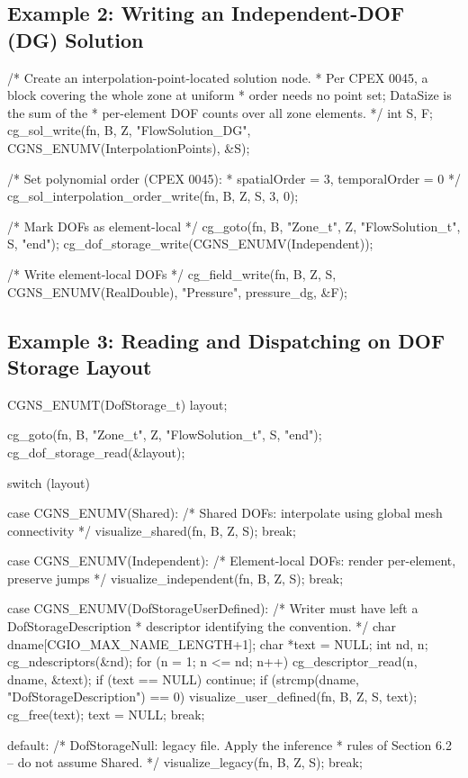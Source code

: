 \documentclass[11pt,letterpaper]{article}
\makeatletter
\let\cgns@orig@lstlisting\lstlisting
\let\cgns@endorig@lstlisting\endlstlisting
\renewenvironment{lstlisting}
  {\par\needspace{5\baselineskip}\nolinenumbers\cgns@orig@lstlisting}
  {\cgns@endorig@lstlisting\par\linenumbers}
\makeatother
\begin{document}
\subsection{Example 2: Writing an Independent-DOF (DG) Solution}
\label{ex:dg-write}

\begin{lstlisting}[language=C]
/* Create an interpolation-point-located solution node.
 * Per CPEX 0045, a block covering the whole zone at uniform
 * order needs no point set; DataSize is the sum of the
 * per-element DOF counts over all zone elements. */
int S, F;
cg_sol_write(fn, B, Z, "FlowSolution_DG",
    CGNS_ENUMV(InterpolationPoints), &S);

/* Set polynomial order (CPEX 0045):
 * spatialOrder = 3, temporalOrder = 0 */
cg_sol_interpolation_order_write(fn, B, Z, S, 3, 0);

/* Mark DOFs as element-local */
cg_goto(fn, B, "Zone_t", Z, "FlowSolution_t", S, "end");
cg_dof_storage_write(CGNS_ENUMV(Independent));

/* Write element-local DOFs */
cg_field_write(fn, B, Z, S, CGNS_ENUMV(RealDouble),
    "Pressure", pressure_dg, &F);
\end{lstlisting}

\subsection{Example 3: Reading and Dispatching on DOF Storage Layout}
\label{ex:dispatch}

\begin{lstlisting}[language=C]
CGNS_ENUMT(DofStorage_t) layout;

cg_goto(fn, B, "Zone_t", Z, "FlowSolution_t", S, "end");
cg_dof_storage_read(&layout);

switch (layout) {
case CGNS_ENUMV(Shared):
    /* Shared DOFs: interpolate using global mesh connectivity */
    visualize_shared(fn, B, Z, S);
    break;

case CGNS_ENUMV(Independent):
    /* Element-local DOFs: render per-element, preserve jumps */
    visualize_independent(fn, B, Z, S);
    break;

case CGNS_ENUMV(DofStorageUserDefined): {
    /* Writer must have left a DofStorageDescription
     * descriptor identifying the convention. */
    char dname[CGIO_MAX_NAME_LENGTH+1];
    char *text = NULL;
    int nd, n;
    cg_ndescriptors(&nd);
    for (n = 1; n <= nd; n++) {
        cg_descriptor_read(n, dname, &text);
        if (text == NULL) continue;
        if (strcmp(dname, "DofStorageDescription") == 0)
            visualize_user_defined(fn, B, Z, S, text);
        cg_free(text);
        text = NULL;
    }
    break;
}

default:
    /* DofStorageNull: legacy file.  Apply the inference
     * rules of Section 6.2 -- do not assume Shared. */
    visualize_legacy(fn, B, Z, S);
    break;
}
\end{lstlisting}
\end{document}
